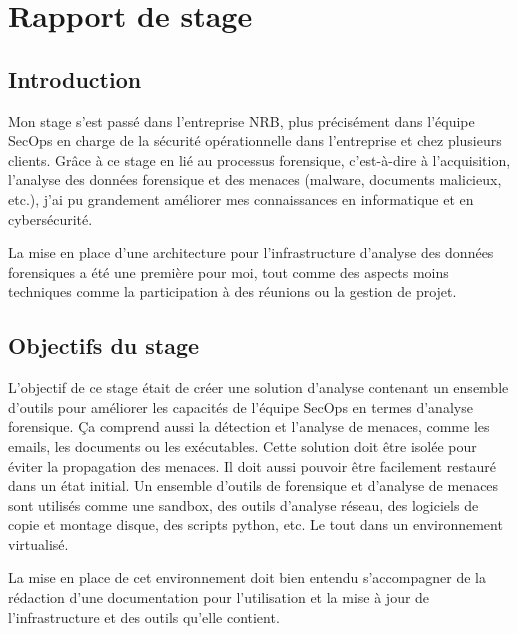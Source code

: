
\chapter{Rapport de stage}










\section{Introduction}

Mon stage s'est passé dans l'entreprise NRB, plus précisément dans l'équipe SecOps en charge de la sécurité opérationnelle dans l'entreprise et chez plusieurs clients. Grâce à ce stage en lié au processus forensique, c'est-à-dire à l'acquisition, l'analyse des données forensique et des menaces (malware, documents malicieux, etc.), j'ai pu grandement améliorer mes connaissances en informatique et en cybersécurité.

La mise en place d'une architecture pour l'infrastructure d'analyse des données forensiques a été une première pour moi, tout comme des aspects moins techniques comme la participation à des réunions ou la gestion de projet.





\section{Objectifs du stage}

L'objectif de ce stage était de créer une solution d'analyse contenant un ensemble d'outils pour améliorer les capacités de l'équipe SecOps en termes d'analyse forensique. Ça comprend aussi la détection et l'analyse de menaces, comme les emails, les documents ou les exécutables. Cette solution doit être isolée pour éviter la propagation des menaces. Il doit aussi pouvoir être facilement restauré dans un état initial. Un ensemble d’outils de forensique et d’analyse de menaces sont utilisés comme une sandbox, des outils d'analyse réseau, des logiciels de copie et montage disque, des scripts python, etc. Le tout dans un environnement virtualisé.

La mise en place de cet environnement doit bien entendu s'accompagner de la rédaction d'une documentation pour l'utilisation et la mise à jour de l'infrastructure et des outils qu'elle contient.





